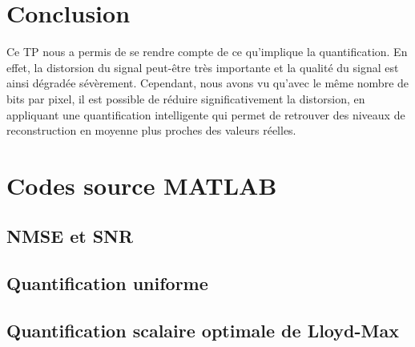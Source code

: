 \documentclass[a4paper, 12pt]{article}
\newcommand{\FSource}[1]{%

}
\begin{document}
\newpage

\section{Conclusion}

Ce TP nous a permis de se rendre compte de ce qu'implique la quantification. En effet, la distorsion du signal peut-être très importante et la qualité du signal est ainsi dégradée sévèrement. Cependant, nous avons vu qu'avec le même nombre de bits par pixel, il est possible de réduire significativement la distorsion, en appliquant une quantification intelligente qui permet de retrouver des niveaux de reconstruction en moyenne plus proches des valeurs réelles.

\clearpage
\appendix

\section{Codes source MATLAB}
\subsection{NMSE et SNR}\label{nmse_snr_code}

\FSource{../disto_1_1.m}

\newpage

\subsection{Quantification uniforme}\label{quant_uni_code}

\FSource{../quant_uni_1_2.m}

\newpage

\subsection{Quantification scalaire optimale de Lloyd-Max}\label{quant_lloyd}

\FSource{../lloyd_max_2_1.m}
\end{document}
